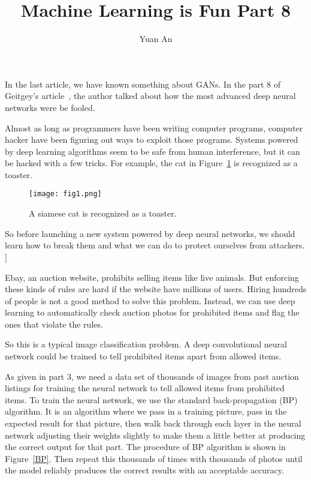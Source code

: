 \documentclass[10pt,twocolumn,letterpaper]{article}
\begin{document}
	\title{Machine Learning is Fun Part 8}	
	\author{Yuan An}
	\maketitle
	In the last article, we have known something about GANs.  In the part 8 of Geitgey's article~\cite{MLisFun}, the author talked about how the most advanced deep neural networks were be fooled.
	\par
	Almost as long as programmers have been writing computer programs, computer hacker have been figuring out ways to exploit those programs. Systems powered by deep learning algorithms seem to be safe from human interference, but it can be hacked with a few tricks. For example, the cat in Figure~\ref{fig1} is recognized as a toaster.
	\begin{figure}[h]
		\centering
		\texttt{[image: fig1.png]}
		\caption{A siamese cat is recognized as a toaster.} \label{fig1}
	\end{figure}
	\par
	So before launching a new system powered by deep neural networks, we should learn how to break them and what we can do to protect ourselves from attackers.
	]
	\par
	Ebay, an auction website, prohibits selling items like live animals. But enforcing these kinds of rules are hard if the website have millions of users. Hiring hundreds of people is not a good method to solve this problem. Instead, we can use deep learning to automatically check auction photos for prohibited items and flag the ones that violate the rules.
	\par
	So this is a typical image classification problem. A deep convolutional neural network could be trained to tell prohibited items apart from allowed items.
	\par
	As given in part 3, we need a data set of thousands of images from past auction listings for training the neural network to tell allowed items from prohibited items. To train the neural network, we use the standard back-propagation (BP) algorithm. It is an algorithm where we pass in a training picture, pass in the expected result for that picture, then walk back through each layer in the neural network adjusting their weights slightly to make them a little better at producing the correct output for that part. The procedure of BP algorithm is shown in Figure~\ref{BP}. Then repeat this thousands of times with thousands of photos until the model reliably produces the correct results with an acceptable accuracy.
\end{document}
